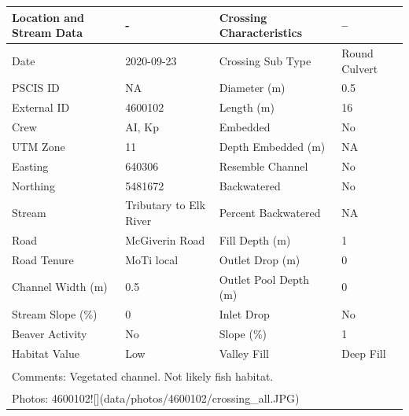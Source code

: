 \documentclass[
]{book}
\begin{document}
\begin{tabular}{llll}
\toprule
Location and Stream Data & - & Crossing Characteristics & --\\
\midrule
Date & 2020-09-23 & Crossing Sub Type & Round Culvert\\
PSCIS ID & NA & Diameter (m) & 0.5\\
External ID & 4600102 & Length (m) & 16\\
Crew & AI, Kp & Embedded & No\\
UTM Zone & 11 & Depth Embedded (m) & NA\\
\addlinespace
Easting & 640306 & Resemble Channel & No\\
Northing & 5481672 & Backwatered & No\\
Stream & Tributary to Elk River & Percent Backwatered & NA\\
Road & McGiverin Road & Fill Depth (m) & 1\\
Road Tenure & MoTi local & Outlet Drop (m) & 0\\
\addlinespace
Channel Width (m) & 0.5 & Outlet Pool Depth (m) & 0\\
Stream Slope (\%) & 0 & Inlet Drop & No\\
Beaver Activity & No & Slope (\%) & 1\\
Habitat Value & Low & Valley Fill & Deep Fill\\
\bottomrule
\multicolumn{4}{l}{\textsuperscript{} Comments: Vegetated channel. Not likely fish habitat.}\\
\multicolumn{4}{l}{\textsuperscript{} Photos: 4600102![](data/photos/4600102/crossing\_all.JPG)}\\
\end{tabular}
\end{document}
